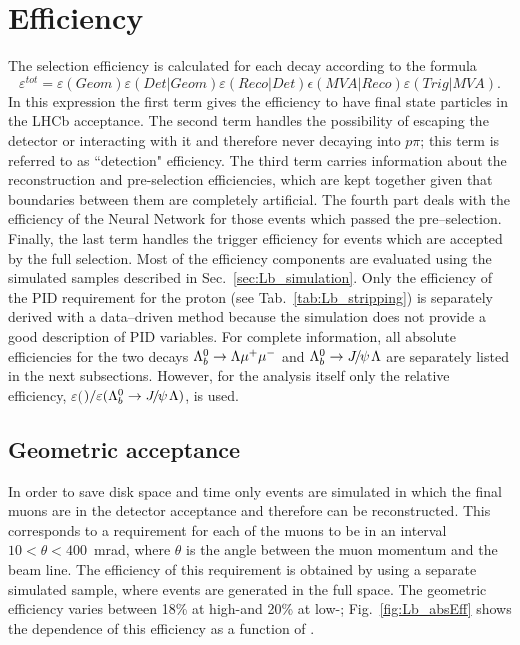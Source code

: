 \section{Efficiency}
\label{sec:Lb_eff}

The selection efficiency is calculated for each decay according to the formula
\begin{equation}
\varepsilon^{tot}=\varepsilon(Geom)\varepsilon(Det|Geom)\varepsilon(Reco|Det)\epsilon(MVA|Reco)\varepsilon(Trig|MVA).
\end{equation}
In this expression the first term gives the efficiency to have final state particles in the LHCb acceptance.
The second term handles the possibility of \Lz escaping the detector or interacting with it and therefore
never decaying into $p\pi$; this term is referred to as ``detection" efficiency.
The third term carries information about the reconstruction and pre-selection efficiencies,
which are kept together given that boundaries between them are completely artificial.
The fourth part deals with the efficiency of the Neural Network for those events which passed the pre--selection. 
Finally, the last term handles the trigger efficiency for events which are accepted by the full selection.
Most of the efficiency components are evaluated using the simulated samples described in Sec.~\ref{sec:Lb_simulation}.
Only the efficiency of the PID requirement for the proton (see Tab.~\ref{tab:Lb_stripping}) is separately derived
with a data--driven method because the simulation does not provide a good description of PID variables.
For complete information, all absolute efficiencies for the two decays $\Lambda^0_b\rightarrow\Lambda\mu^+\mu^-$ and $\Lb\to\jpsi\Lz$ are
separately listed in the next subsections. However, for the analysis itself only the relative efficiency,
$\varepsilon($\Lb\to\Lz\mumu$)/\varepsilon(\Lb\to\jpsi\Lz)$, is used. 


\subsection{Geometric acceptance}
\label{sec:Lb_geomAcc}
In order to save disk space and time only events are simulated in which the final muons
are in the detector acceptance and therefore can be reconstructed. This corresponds to a requirement for each
of the muons to be in an interval \mbox{$10 < \theta < 400$~mrad}, where $\theta$ is the angle between
the muon momentum and the beam line. The efficiency of this requirement is obtained by using 
a separate simulated sample, where events are generated in the full space.
The geometric efficiency varies between 18\% at high-\qsq and 20\% at low-\qsq;
Fig.~\ref{fig:Lb_absEff} shows the dependence of this efficiency as a function of \qsq.

